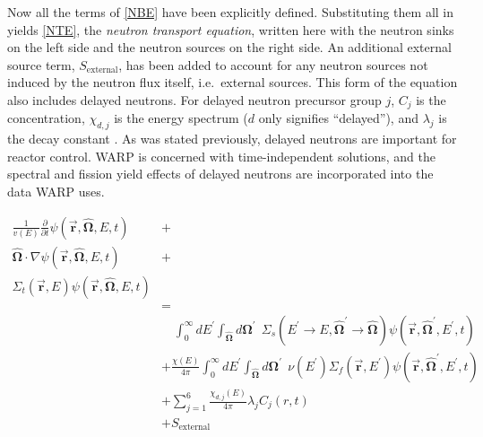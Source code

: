 Now all the terms of \eqref{NBE} have been explicitly defined.  Substituting them all in yields \eqref{NTE}, the \emph{neutron transport equation}, written here with the neutron sinks on the left side and the neutron sources on the right side.  An additional external source term, $S_{\mathrm{external}}$, has been added to account for any neutron sources not induced by the neutron flux itself, i.e.\ external sources.  This form of the equation also includes delayed neutrons.  For delayed neutron precursor group $j$, $C_j$ is the concentration, $\chi_{d,j}$ is the energy spectrum ($d$ only signifies ``delayed''), and $\lambda_j$ is the decay constant \cite{jasmina_book}.  As was stated previously, delayed neutrons are important for reactor control.  WARP is concerned with time-independent solutions, and the spectral and fission yield effects of delayed neutrons are incorporated into the data WARP uses.

\begin{equation}
\label{NTE}
\begin{split}
\frac{1}{v(E)} \frac{\partial }{\partial t}\psi(\boldsymbol{\vec{r}},\boldsymbol{\hat{\Omega}},E,t) &+  \\
\boldsymbol{\hat{\Omega}}  \cdot \nabla \psi(\boldsymbol{\vec{r}},\boldsymbol{\hat{\Omega}},E,t) &+ \\
\Sigma_t(\boldsymbol{\vec{r}},E) \psi(\boldsymbol{\vec{r}},\boldsymbol{\hat{\Omega}},E,t) & \\
& =  \\
& \quad \int_0^\infty dE^\prime \int_{\boldsymbol{\hat{\Omega}}} d\boldsymbol{\Omega}^\prime \:\: \Sigma_s(E^\prime \rightarrow E,\boldsymbol{\hat{\Omega}}^\prime \rightarrow \boldsymbol{\hat{\Omega}}) \psi(\boldsymbol{\vec{r}},\boldsymbol{\hat{\Omega}}^\prime,E^\prime,t)    \\
&+ \frac{\chi(E)}{4\pi} \int_0^\infty dE^\prime  \int_{\boldsymbol{\hat{\Omega}}} d\boldsymbol{\Omega}^\prime \:\:  \nu(E^\prime) \Sigma_f(\boldsymbol{\vec{r}},E^\prime) \psi(\boldsymbol{\vec{r}},\boldsymbol{\hat{\Omega}}^\prime,E^\prime,t)  \\
& + \sum_{j=1}^{6}\frac{\chi_{d,j}(E)}{4\pi} \lambda_j C_j(r,t)     \\
& + S_{\mathrm{external}}
\end{split}
 \end{equation}
 
